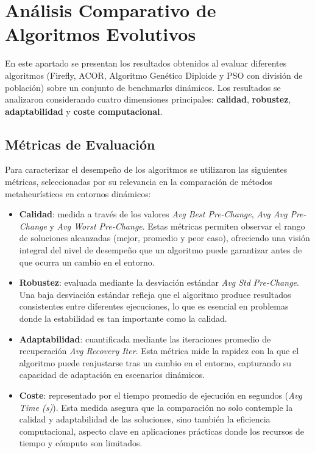 \documentclass[10pt,twocolumn]{article}
\begin{document}
\section*{Análisis Comparativo de Algoritmos Evolutivos}

En este apartado se presentan los resultados obtenidos al evaluar diferentes algoritmos (Firefly, ACOR, Algoritmo Genético Diploide y PSO con división de población) sobre un conjunto de benchmarks dinámicos. Los resultados se analizaron considerando cuatro dimensiones principales: \textbf{calidad}, \textbf{robustez}, \textbf{adaptabilidad} y \textbf{coste computacional}.

\subsection*{Métricas de Evaluación}

Para caracterizar el desempeño de los algoritmos se utilizaron las siguientes métricas, seleccionadas por su relevancia en la comparación de métodos metaheurísticos en entornos dinámicos:

\begin{itemize}
    \item \textbf{Calidad}: medida a través de los valores \textit{Avg Best Pre-Change}, \textit{Avg Avg Pre-Change} y \textit{Avg Worst Pre-Change}. 
    Estas métricas permiten observar el rango de soluciones alcanzadas (mejor, promedio y peor caso), ofreciendo una visión integral del nivel de desempeño que un algoritmo puede garantizar antes de que ocurra un cambio en el entorno.
    
    \item \textbf{Robustez}: evaluada mediante la desviación estándar \textit{Avg Std Pre-Change}. 
    Una baja desviación estándar refleja que el algoritmo produce resultados consistentes entre diferentes ejecuciones, lo que es esencial en problemas donde la estabilidad es tan importante como la calidad.
    
    \item \textbf{Adaptabilidad}: cuantificada mediante las iteraciones promedio de recuperación \textit{Avg Recovery Iter}. 
    Esta métrica mide la rapidez con la que el algoritmo puede reajustarse tras un cambio en el entorno, capturando su capacidad de adaptación en escenarios dinámicos.
    
    \item \textbf{Coste}: representado por el tiempo promedio de ejecución en segundos (\textit{Avg Time (s)}). 
    Esta medida asegura que la comparación no solo contemple la calidad y adaptabilidad de las soluciones, sino también la eficiencia computacional, aspecto clave en aplicaciones prácticas donde los recursos de tiempo y cómputo son limitados.
\end{itemize}
\end{document}
